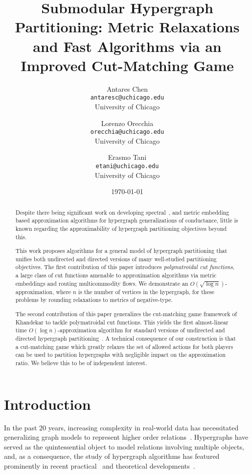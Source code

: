 \documentclass[letterpaper]{article}
\title{Submodular Hypergraph Partitioning: Metric Relaxations and Fast Algorithms via an Improved Cut-Matching Game}
\author{Antares Chen\\
\texttt{antaresc@uchicago.edu}\\
University of Chicago
\and
Lorenzo Orecchia\\
\texttt{orecchia@uchicago.edu}\\
University of Chicago
\and
Erasmo Tani\\
\texttt{etani@uchicago.edu}
\\
University of Chicago
}
\date{\today}
\begin{document}
\maketitle



\begin{abstract}
Despite there being significant work on developing spectral~\cite{chan2018spectral,lau2022cheeger,kwok2022cheeger}, and metric embedding~\cite{louis2016approximation} based approximation algorithms for hypergraph generalizations of conductance, little is known regarding the approximability of hypergraph partitioning objectives beyond this.

This work proposes algorithms for a general model of hypergraph partitioning that unifies both undirected and directed versions of many well-studied partitioning objectives. The first contribution of this paper introduces \emph{polymatroidal cut functions}, a large class of cut functions amenable to approximation algorithms via metric embeddings and routing multicommodity flows. We demonstrate an $O(\sqrt{\log n})$-approximation, where $n$ is the number of vertices in the hypergraph, for these problems by rounding relaxations to metrics of negative-type.

The second contribution of this paper generalizes the cut-matching game framework of Khandekar \etal \cite{khandekar2007cut} to tackle polymatroidal cut functions. This yields the first almost-linear time $O(\log n)$-approximation algorithm for standard versions of undirected and directed hypergraph partitioning~\cite{kwok2022cheeger}. A technical consequence of our construction is that a cut-matching game which greatly relaxes the set of allowed actions for both players can be used to partition hypergraphs with negligible impact on the approximation ratio. We believe this to be of independent interest.
\end{abstract}

\newpage


\section{Introduction}

In the past 20 years, increasing complexity in real-world data has necessitated generalizing graph models to represent higher order relations~\cite{agarwalHigherOrderLearning2006, catalyurekHypergraphpartitioningbasedDecompositionParallel1999}. Hypergraphs have served as the quintessential object to model relations involving multiple objects, and, as a consequence, the study of hypergraph algorithms has featured prominently in recent practical~\cite{bensonHigherorderOrganizationComplex2016,tsourakakis2017scalable} and theoretical developments~\cite{chan2018spectral,chan2012linear, louis2015hypergraph,louis2016approximation}.
\end{document}
